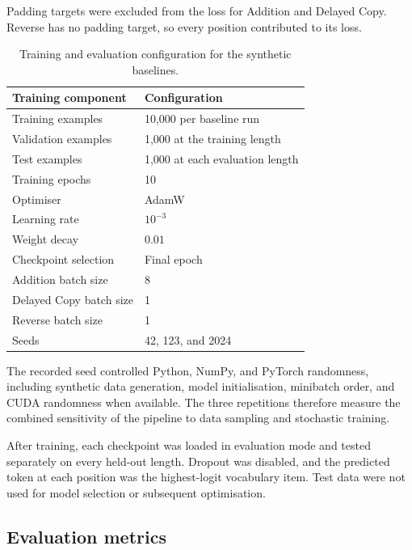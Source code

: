 \documentclass[
    author={Aanchala Ravindra Bhongade},
    supervisor={Dr. Fernando Moreno-Pino},
    degree={MSc},
    title={Length Generalisation in Transformer-Based Sequence Models: Failure Taxonomy and Mitigation Strategies},
    subtitle={},
    type={},
    year={2026}
]{dissertation}
\begin{document}
Padding targets were excluded from the loss for Addition and Delayed Copy. Reverse has no padding target, so every position contributed to its loss.

\begin{table}[tbp]
\centering
\small
\renewcommand{\arraystretch}{1.15}
\begin{tabular}{
    p{}
    p{}
}
\hline
\textbf{Training component} & \textbf{Configuration} \\
\hline
Training examples & 10,000 per baseline run \\
Validation examples & 1,000 at the training length \\
Test examples & 1,000 at each evaluation length \\
Training epochs & 10 \\
Optimiser & AdamW \\
Learning rate & \(10^{-3}\) \\
Weight decay & \(0.01\) \\
Checkpoint selection & Final epoch \\
Addition batch size & 8 \\
Delayed Copy batch size & 1 \\
Reverse batch size & 1 \\
Seeds & 42, 123, and 2024 \\
\hline
\end{tabular}
\caption{Training and evaluation configuration for the synthetic baselines.}
\label{tab:training-configuration}
\end{table}

The recorded seed controlled Python, NumPy, and PyTorch randomness, including synthetic data generation, model initialisation, minibatch order, and CUDA randomness when available. The three repetitions therefore measure the combined sensitivity of the pipeline to data sampling and stochastic training.

After training, each checkpoint was loaded in evaluation mode and tested separately on every held-out length. Dropout was disabled, and the predicted token at each position was the highest-logit vocabulary item. Test data were not used for model selection or subsequent optimisation.

\subsection{Evaluation metrics}
\label{sec:evaluation-metrics}
\end{document}
